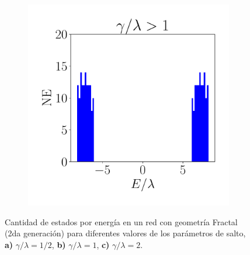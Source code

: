 \begin{figure}[h!]
\begin{subfigure}[b!]{0.3 \textwidth}
         \label{}
     \end{subfigure}\hspace*{1em}
     \begin{subfigure}[b!]{0.3 \textwidth}
         \caption{}
         \includegraphics[width=\textwidth]{Imagenes/Resultados_Hoti_Fractal/bars_square3.pdf}
         \label{}
     \end{subfigure}\hspace*{1em}\vspace*{-1.5em}
        \caption{Cantidad de estados por energía en un red con geometría Fractal (2da generación) para diferentes valores de los parámetros de salto, \textbf{a)} $\gamma /\lambda = 1/2$, \textbf{b)} $\gamma /\lambda = 1$, \textbf{c)} $\gamma /\lambda = 2$.}
    \label{fig:Dos_fractal}
        \label{fig:Dos_Cuadrado}
\end{figure}